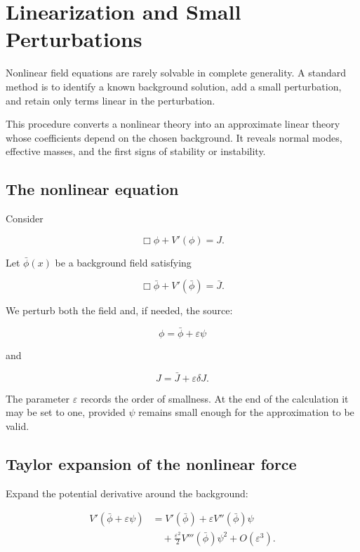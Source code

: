 \section{Linearization and Small Perturbations}
\label{sec:linearization_and_small_perturbations}

Nonlinear field equations are rarely solvable in complete generality. A standard method is to identify a known background solution, add a small perturbation, and retain only terms linear in the perturbation.

This procedure converts a nonlinear theory into an approximate linear theory whose coefficients depend on the chosen background. It reveals normal modes, effective masses, and the first signs of stability or instability.

\subsection{The nonlinear equation}

Consider

\[
\boxed{
\Box\phi
+
V'(\phi)
=
J
}.
\]

Let \(\bar\phi(x)\) be a background field satisfying

\[
\boxed{
\Box\bar\phi
+
V'(\bar\phi)
=
\bar J
}.
\]

We perturb both the field and, if needed, the source:

\[
\boxed{
\phi
=
\bar\phi
+
\varepsilon\psi
}
\]

and

\[
J
=
\bar J
+
\varepsilon\delta J.
\]

The parameter \(\varepsilon\) records the order of smallness. At the end of the calculation it may be set to one, provided \(\psi\) remains small enough for the approximation to be valid.

\subsection{Taylor expansion of the nonlinear force}

Expand the potential derivative around the background:

\[
\begin{aligned}
V'(\bar\phi+\varepsilon\psi)
&=
V'(\bar\phi)
+
\varepsilon
V''(\bar\phi)\psi\\
&\quad+
\frac{\varepsilon^{2}}{2}
V'''(\bar\phi)\psi^{2}
+
O(\varepsilon^{3}).
\end{aligned}
\]

